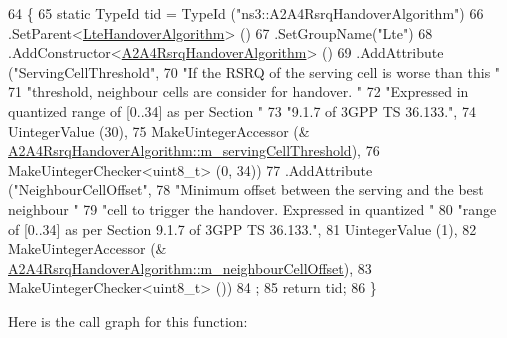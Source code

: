 \begin{DoxyCode}
64 \{
65   \textcolor{keyword}{static} TypeId tid = TypeId (\textcolor{stringliteral}{"ns3::A2A4RsrqHandoverAlgorithm"})
66     .SetParent<\hyperlink{classns3_1_1LteHandoverAlgorithm_acb457c6d2a93677efd36a65376ce31fc}{LteHandoverAlgorithm}> ()
67     .SetGroupName(\textcolor{stringliteral}{"Lte"})
68     .AddConstructor<\hyperlink{classns3_1_1A2A4RsrqHandoverAlgorithm_a4ddb6f19752cdf9b5db9d98ec0888a5c}{A2A4RsrqHandoverAlgorithm}> ()
69     .AddAttribute (\textcolor{stringliteral}{"ServingCellThreshold"},
70                    \textcolor{stringliteral}{"If the RSRQ of the serving cell is worse than this "}
71                    \textcolor{stringliteral}{"threshold, neighbour cells are consider for handover. "}
72                    \textcolor{stringliteral}{"Expressed in quantized range of [0..34] as per Section "}
73                    \textcolor{stringliteral}{"9.1.7 of 3GPP TS 36.133."},
74                    UintegerValue (30),
75                    MakeUintegerAccessor (&
      \hyperlink{classns3_1_1A2A4RsrqHandoverAlgorithm_acb5609bb57548a7cd9fe92fbef4dd99b}{A2A4RsrqHandoverAlgorithm::m\_servingCellThreshold}),
76                    MakeUintegerChecker<uint8\_t> (0, 34))
77     .AddAttribute (\textcolor{stringliteral}{"NeighbourCellOffset"},
78                    \textcolor{stringliteral}{"Minimum offset between the serving and the best neighbour "}
79                    \textcolor{stringliteral}{"cell to trigger the handover. Expressed in quantized "}
80                    \textcolor{stringliteral}{"range of [0..34] as per Section 9.1.7 of 3GPP TS 36.133."},
81                    UintegerValue (1),
82                    MakeUintegerAccessor (&
      \hyperlink{classns3_1_1A2A4RsrqHandoverAlgorithm_afe15ce0bd178565ef3f42d83ada4428b}{A2A4RsrqHandoverAlgorithm::m\_neighbourCellOffset}),
83                    MakeUintegerChecker<uint8\_t> ())
84   ;
85   \textcolor{keywordflow}{return} tid;
86 \}
\end{DoxyCode}


Here is the call graph for this function\+:


